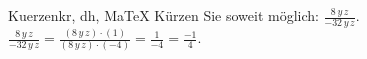 \begin{MAufgabe}{Kuerzen}{kr, dh, MaTeX}
K\"urzen Sie soweit m\"oglich: $\frac{8\, y\, z}{- 32\, y\, z}$.\\ 
\ifLsg\MLoesung
\quad $\frac{8\, y\, z}{- 32\, y\, z}=\frac{(8\, y\, z)\cdot(1)}{(8\, y\, z)\cdot(-4)}=\frac{1}{-4}=\frac{-1}{4}$.\else\relax\fi
 \end{MAufgabe}